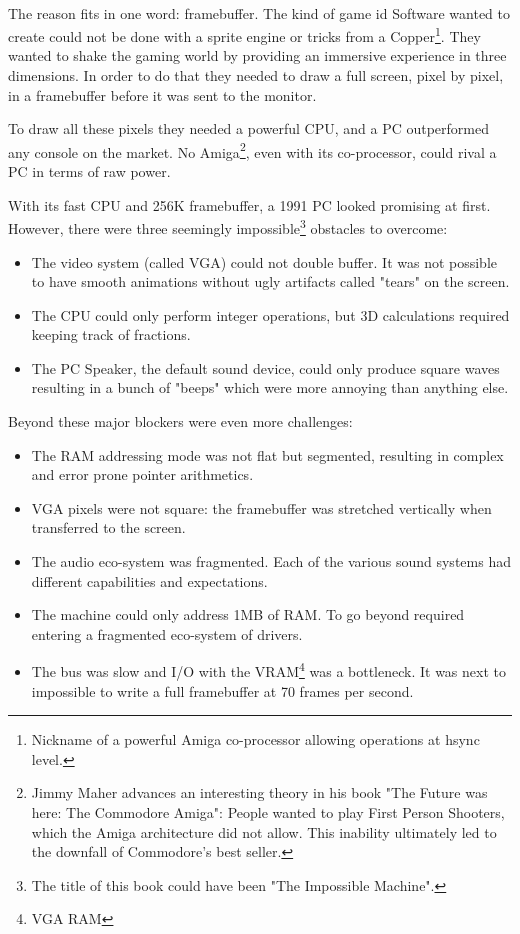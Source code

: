 \\
The reason fits in one word: framebuffer. The kind of game id Software wanted to create could not be done with a sprite engine or tricks from a Copper\footnote{Nickname of a powerful Amiga co-processor allowing operations at hsync level.}. They wanted to shake the gaming world by providing an immersive experience in three dimensions. In order to do that they needed to draw a full screen, pixel by pixel, in a framebuffer before it was sent to the monitor. \\
\par
To draw all these pixels they needed a powerful CPU, and a PC outperformed any console on the market. No Amiga\footnote{Jimmy Maher advances an interesting theory in his book "The Future was here: The Commodore Amiga": People wanted to play First Person Shooters, which the Amiga architecture did not allow. This inability ultimately led to the downfall of Commodore's best seller.}, even with its co-processor, could rival a PC in terms of raw power.
\par


 
With its fast CPU and 256K framebuffer, a 1991 PC looked promising at first. However, there were three seemingly impossible\footnote{The title of this book could have been "The Impossible Machine".} obstacles to overcome:\\
\begin{itemize}
\item The video system (called VGA) could not double buffer. It was not possible to have smooth animations without ugly artifacts called "tears" on the screen.
\item The CPU could only perform integer operations, but 3D calculations required keeping track of fractions.
\item The PC Speaker, the default sound device, could only produce square waves resulting in a bunch of "beeps" which were more annoying than anything else.
\end{itemize}
Beyond these major blockers were even more challenges:\\
\begin{itemize}
\item The RAM addressing mode was not flat but segmented, resulting in complex and error prone pointer arithmetics.
\item VGA pixels were not square: the framebuffer was stretched vertically when
transferred to the screen.
\item The audio eco-system was fragmented. Each of the various sound systems had different capabilities and expectations.
\item The machine could only address 1MB of RAM. To go beyond required entering a fragmented eco-system of drivers.
\item The bus was slow and I/O with the VRAM\footnote{VGA RAM} was a bottleneck. It was next to impossible to write a full framebuffer at 70 frames per second.
\end{itemize}

